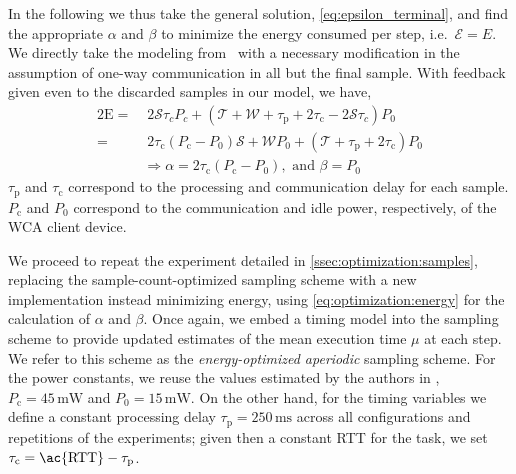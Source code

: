 In the following we thus take the general solution, \cref{eq:epsilon_terminal}, and find the appropriate \( \alpha \) and \( \beta \) to minimize the energy consumed per step, i.e.\ \( \mathcal{E}=E \).
We directly take the modeling from~\cite{secAperiodic} with a necessary modification in the assumption of one-way communication in all but the final sample.
With feedback given even to the discarded samples in our model, we have, 
\begin{alignat}{2}
    \mathrm{E}=&\;2\mathcal{S}\tau_cP_c+(\mathcal{T}+\mathcal{W}+\tau_\mathrm{p}+2\tau_\mathrm{c}-2\mathcal{S}\tau_c)P_0\nonumber\\
    =&\;2\tau_{\text{c}}(P_{\text{c}} -P_0)\mathcal{S}+\mathcal{W}P_0+(\mathcal{T}+\tau_{\text{p}} +2\tau_{\text{c}}) P_0\nonumber\\
&\Rightarrow \alpha=2\tau_{\text{c}}(P_{\text{c}} -P_0),\text{ and }\beta=P_0 \label{eq:optimization:energy}
\end{alignat}
\( \tau_\text{p} \) and \( \tau_\text{c} \) correspond to the processing and communication delay for each sample.
\( P_\text{c} \) and \( P_0 \) correspond to the communication and idle power, respectively, of the \ac{WCA} client device.

We proceed to repeat the experiment detailed in \cref{ssec:optimization:samples}, replacing the sample-count-optimized sampling scheme with a new implementation instead minimizing energy, using \cref{eq:optimization:energy} for the calculation of \( \alpha \) and \( \beta \).
Once again, we embed a timing model into the sampling scheme to provide updated estimates of the mean execution time \( \mu \) at each step.
We refer to this scheme as the \emph{energy-optimized aperiodic} sampling scheme.
For the power constants, we reuse the values estimated by the authors in \textcite{TMCperiodic}, \( P_\text{c} = 45\,\si{\milli\watt} \) and \( P_\text{0} = 15\,\si{\milli\watt} \).
On the other hand, for the timing variables we define a constant processing delay \( \tau_\text{p} = 250\,\si{\milli\second} \) across all configurations and repetitions of the experiments; given then a constant \ac{RTT} for the task, we set \( \tau_\text{c} = \text{\ac{RTT}} - \tau_\text{p} \).

